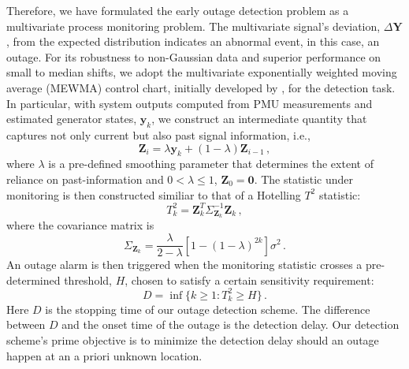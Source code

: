 Therefore, we have formulated the early outage detection problem as a multivariate process monitoring problem. The multivariate signal's deviation, $\Delta \boldsymbol{Y}$, from the expected distribution indicates an abnormal event, in this case, an outage. For its robustness to non-Gaussian data and superior performance on small to median shifts, we adopt the multivariate exponentially weighted moving average (MEWMA) control chart, initially developed by \cite{lowry1992multivariate}, for the detection task. In particular, with system outputs computed from PMU measurements and estimated generator states, $\boldsymbol{y}_k$, we construct an intermediate quantity that captures not only current but also past signal information, i.e.,
\begin{equation}
\label{eqn:ewma_z}
\boldsymbol{Z}_i = \lambda \boldsymbol{y}_k + (1 - \lambda) \boldsymbol{Z}_{i-1} \,,
\end{equation}
where $\lambda$ is a pre-defined smoothing parameter that determines the extent of reliance on past-information and $0<\lambda \le 1$, $\boldsymbol{Z}_0 = \mathbf{0}$. The statistic under monitoring is then constructed similiar to that of a Hotelling $T^2$ statistic:
\begin{equation}
\label{eqn:ewma_T}
T^2_k = \boldsymbol{Z}_k^T\Sigma_{\boldsymbol{Z}_k}^{-1}\boldsymbol{Z}_k \,,
\end{equation}
where the covariance matrix is 
$$
\Sigma_{\boldsymbol{Z}_k} = \frac{\lambda}{2 - \lambda}\left[1-(1-\lambda)^{2k}\right]\sigma^2 \,.
$$
An outage alarm is then triggered when the monitoring statistic crosses a pre-determined threshold, $H$, chosen to satisfy a certain sensitivity requirement:
\begin{equation}
\label{eqn:control_chart}
D = \inf\lbrace k\ge1 : T^2_k \ge H \rbrace \,.
\end{equation}
Here $D$ is the stopping time of our outage detection scheme. The difference between $D$ and the onset time of the outage is the detection delay. Our detection scheme's prime objective is to minimize the detection delay should an outage happen at an a priori unknown location.


